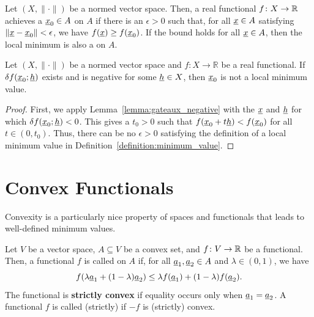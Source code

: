 \begin{definition}
\label{definition:minimum_value}
Let $(X,\|\cdot\|)$ be a normed vector space.
Then, a real functional $f \colon X \rightarrow \mathbb{R}$ achieves a  $\underline{x}_0 \in A$ on $A$ if there is an $\epsilon > 0$ such that, for all $\underline{x}\in A$ satisfying $\| \underline{x} - \underline{x}_0 \| < \epsilon$, we have  $f(\underline{x}) \geq f(\underline{x}_0)$.
If the bound holds for all $\underline{x} \in A$, then the local minimum is also a  on $A$.
\end{definition}

\begin{theorem}
Let $(X,\|\cdot\|)$ be a normed vector space and $f\colon X \to \mathbb{R}$ be a real functional.
If $\delta f (\underline{x}_0;\underline{h})$ exists and is negative for some $\underline{h} \in X$, then $\underline{x}_0$ is not a local minimum value.
\end{theorem}
\begin{proof}
First, we apply Lemma~\ref{lemma:gateaux_negative} with the $\underline{x}$ and $\underline{h}$ for which $\delta f (\underline{x}_0;\underline{h})<0$.
This gives a $t_0 >0$ such that $f(\underline{x}_0+t \underline{h})<f(\underline{x}_0)$ for all $t\in (0,t_0)$.
Thus, there can be no $\epsilon>0$ satisfying the definition of a local minimum value in  Definition~\ref{definition:minimum_value}.
\end{proof}

\section{Convex Functionals}

Convexity is a particularly nice property of spaces and functionals that leads to well-defined minimum values.




\begin{definition}
Let $V$ be a vector space, $A \subseteq V$ be a convex set, and $f \colon V \rightarrow \mathbb{R}$ be a functional.
Then, a functional $f$ is called  on $A$ if, for all $\underline{a}_1,\underline{a}_2 \in A$ and $\lambda\in(0,1)$, we have
\[ f( \lambda \underline{a}_1 + (1-\lambda) \underline{a}_2 ) \leq \lambda f( \underline{a}_1 ) + (1-\lambda) f ( \underline{a}_2 ). \]
The functional is \textbf{strictly convex} if equality occurs only when $\underline{a}_1 = \underline{a}_2$.
A functional $f$ is called (strictly)  if $-f$ is (strictly) convex.
\end{definition}

